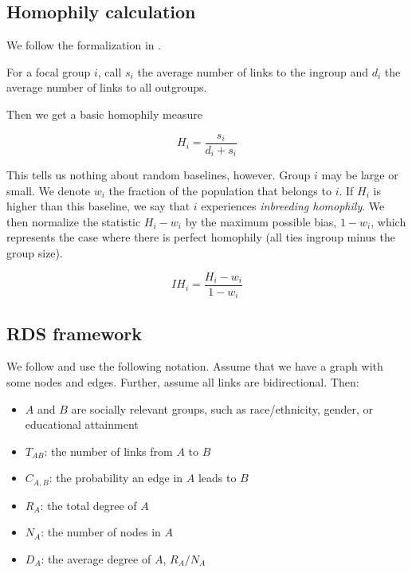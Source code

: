 \documentclass[a4paper]{article}
\begin{document}
\subsection{Homophily calculation}

We follow the formalization in \cite{currarini_economic_2009}.

For a focal group $i$, call $s_i$ the average number of links to the ingroup and $d_i$ the average number of links to all outgroups.

Then we get a basic homophily measure

\begin{equation}
H_i = \frac{s_i}{d_i + s_i}
\end{equation}

This tells us nothing about random baselines, however. Group $i$ may be large or small. We denote $w_i$ the fraction of the population that belongs to $i$. If $H_i$ is higher than this baseline, we say that $i$ experiences \emph{inbreeding homophily}. We then normalize the statistic $H_i - w_i$ by the maximum possible bias, $1 - w_i$, which represents the case where there is perfect homophily (all ties ingroup minus the group size).

\begin{equation}
IH_i = \frac{H_i - w_i}{1 - w_i}
\end{equation}

\subsection{RDS framework}

We follow \cite{Salganik2004} and use the following notation. Assume that we have a graph with some nodes and edges. Further, assume all links are bidirectional. Then:

\begin{itemize}
\item $A$ and $B$ are socially relevant groups, such as race/ethnicity, gender, or educational attainment
\item $T_{AB}$: the number of links from $A$ to $B$
\item $C_{A,B}$: the probability an edge in $A$ leads to $B$
\item $R_A$: the total degree of $A$
\item $N_A$: the number of nodes in $A$
\item $D_A$: the average degree of $A$, $R_A / N_A$
\end{itemize}
\end{document}
